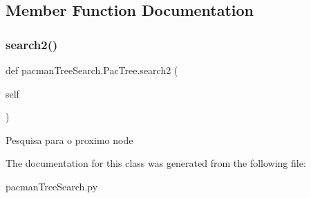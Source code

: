 \subsection{Member Function Documentation}
\mbox{\label{classpacman_tree_search_1_1_pac_tree_a8e481a1b3b4f948610589b0c912d6537}} 
\subsubsection{\texorpdfstring{search2()}{search2()}}
{\footnotesize\ttfamily def pacman\+Tree\+Search.\+Pac\+Tree.\+search2 (\begin{DoxyParamCaption}\item[{}]{self }\end{DoxyParamCaption})}

\begin{DoxyVerb}Pesquisa para o proximo node\end{DoxyVerb}
 

The documentation for this class was generated from the following file\+:\begin{DoxyCompactItemize}
\item 
pacman\+Tree\+Search.\+py\end{DoxyCompactItemize}
